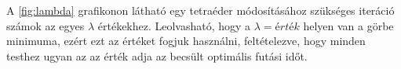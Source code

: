 A \ref{fig:lambda} grafikonon látható egy tetraéder módosításához szükséges iteráció számok az egyes $\lambda$ értékekhez.
Leolvasható, hogy a $\lambda = érték$ helyen van a görbe minimuma, ezért ezt az értéket fogjuk használni, feltételezve, hogy minden testhez ugyan az az érték adja az becsült optimális futási időt.